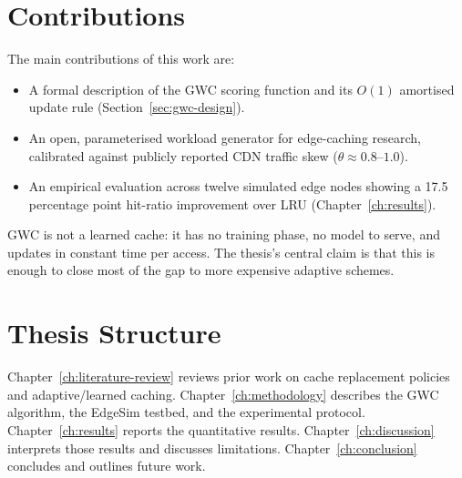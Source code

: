 \section{Contributions}
The main contributions of this work are:
\begin{itemize}
  \item A formal description of the GWC scoring function and its $O(1)$ amortised update rule
        (Section~\ref{sec:gwc-design}).
  \item An open, parameterised workload generator for edge-caching research, calibrated
        against publicly reported CDN traffic skew ($\theta \approx 0.8$--$1.0$).
  \item An empirical evaluation across twelve simulated edge nodes showing a 17.5 percentage
        point hit-ratio improvement over LRU (Chapter~\ref{ch:results}).
\end{itemize}

\begin{keytakeaway}
GWC is not a learned cache: it has no training phase, no model to serve, and updates in
constant time per access. The thesis's central claim is that this is enough to close most
of the gap to more expensive adaptive schemes.
\end{keytakeaway}

\section{Thesis Structure}
Chapter~\ref{ch:literature-review} reviews prior work on cache replacement policies and
adaptive/learned caching. Chapter~\ref{ch:methodology} describes the GWC algorithm, the
EdgeSim testbed, and the experimental protocol. Chapter~\ref{ch:results} reports the
quantitative results. Chapter~\ref{ch:discussion} interprets those results and discusses
limitations. Chapter~\ref{ch:conclusion} concludes and outlines future work.
